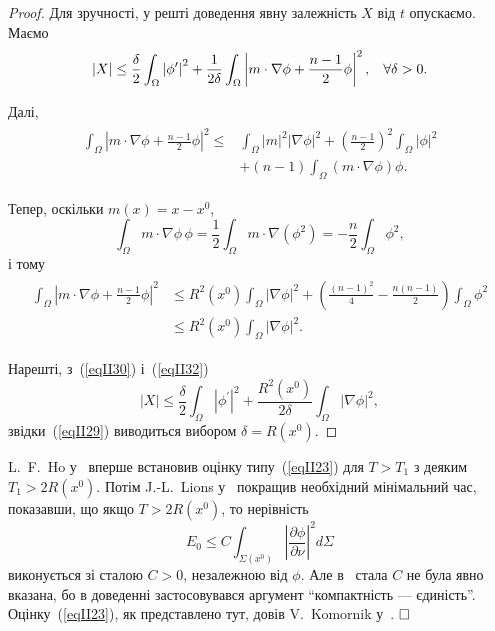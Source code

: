 \begin{proof}
Для зручності, у решті доведення явну залежність $X$ від $t$ опускаємо. Маємо
\begin{equation} \label{eqII30}
\left| X \right| \leq \frac{\delta}{2} \int_\Omega \left| \phi^\prime \right|^2 + \frac{1}{2\delta} \int_\Omega \left| m \cdot \nabla \phi + \frac{n-1}{2} \phi \right|^2 , \hspace{0.3cm} \forall \delta > 0.
\end{equation}

Далі,
\begin{align}\label{eqII31}
\begin{split}
 \int_\Omega \left| m \cdot \nabla \phi + \frac{n-1}{2} \phi \right|^2 \leq &\int_\Omega \left| m \right|^2 \left| \nabla\phi \right|^2 +
 \left( \frac{n-1}{2} \right)^2 \int_\Omega \left| \phi \right|^2
 \\ & +(n-1) \int_\Omega (m \cdot \nabla \phi) \phi.
\end{split}
\end{align}

Тепер, оскільки $m(x) = x-x^0$,
\begin{equation*}
\int_\Omega m \cdot \nabla\phi\,\phi = \frac{1}{2} \int_\Omega m \cdot \nabla (\phi^2) = -\frac{n}{2} \int_\Omega \phi^2,
\end{equation*}
і тому
\begin{align}\label{eqII32}
\begin{split}
\int_\Omega \left| m \cdot \nabla \phi + \frac{n-1}{2} \phi \right|^2  &\leq R^2(x^0) \int_\Omega \left| \nabla\phi \right|^2  + \left( \frac{(n-1)^2}{4} - \frac{n(n-1)}{2} \right) \int_\Omega \phi^2
\\ & \leq R^2(x^0) \int_\Omega \left| \nabla\phi \right|^2.
\end{split}
\end{align}

Нарешті, з~(\ref{eqII30}) і~(\ref{eqII32})
\begin{equation*}
    |X| \leq \frac{\delta}{2} \int_\Omega |\phi^\prime|^2 + \frac{R^2(x^0)}{2\delta} \int_\Omega \left| \nabla\phi \right|^2,
\end{equation*}
звідки~(\ref{eqII29}) виводиться вибором $\delta = R(x^0)$.
\end{proof}

\begin{remark}
\label{remark:II.2.7}
L.~F.~Ho у~\cite{ho1986observabilite} вперше встановив оцінку типу~(\ref{eqII23}) для $T>T_1$ з деяким $T_1 > 2R(x^0)$. Потім J.-L.~Lions у~\cite{lions1988exact} покращив необхідний мінімальний час, показавши, що якщо $T > 2R(x^0)$, то нерівність
\begin{equation*}
    E_0 \leq C \int_{\Sigma(x^0)} \left| \frac{\partial \phi}{\partial \nu} \right|^2 d\Sigma
\end{equation*}
виконується зі сталою $C>0$, незалежною від $\phi$. Але в~\cite{lions1988exact} стала $C$ не була явно вказана, бо в доведенні застосовувався аргумент ``компактність — єдиність''.
Оцінку~(\ref{eqII23}), як представлено тут, довів V.~Komornik у~\cite{komornik1987controlabilite}.
$\hfill \square$
\end{remark}

